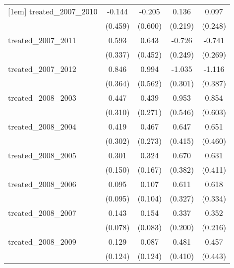 {\begin{tabular}{l*{4}{c}}
[1em]
treated\_2007\_2010&      -0.144         &      -0.205         &       0.136         &       0.097         \\
            &     (0.459)         &     (0.600)         &     (0.219)         &     (0.248)         \\
[1em]
treated\_2007\_2011&       0.593         &       0.643         &      -0.726\sym{**} &      -0.741\sym{**} \\
            &     (0.337)         &     (0.452)         &     (0.249)         &     (0.269)         \\
[1em]
treated\_2007\_2012&       0.846\sym{*}  &       0.994         &      -1.035\sym{***}&      -1.116\sym{**} \\
            &     (0.364)         &     (0.562)         &     (0.301)         &     (0.387)         \\
[1em]
treated\_2008\_2003&       0.447         &       0.439         &       0.953         &       0.854         \\
            &     (0.310)         &     (0.271)         &     (0.546)         &     (0.603)         \\
[1em]
treated\_2008\_2004&       0.419         &       0.467         &       0.647         &       0.651         \\
            &     (0.302)         &     (0.273)         &     (0.415)         &     (0.460)         \\
[1em]
treated\_2008\_2005&       0.301\sym{*}  &       0.324         &       0.670         &       0.631         \\
            &     (0.150)         &     (0.167)         &     (0.382)         &     (0.411)         \\
[1em]
treated\_2008\_2006&       0.095         &       0.107         &       0.611         &       0.618         \\
            &     (0.095)         &     (0.104)         &     (0.327)         &     (0.334)         \\
[1em]
treated\_2008\_2007&       0.143         &       0.154         &       0.337         &       0.352         \\
            &     (0.078)         &     (0.083)         &     (0.200)         &     (0.216)         \\
[1em]
treated\_2008\_2009&       0.129         &       0.087         &       0.481         &       0.457         \\
            &     (0.124)         &     (0.124)         &     (0.410)         &     (0.443)         \\

\end{tabular}}
